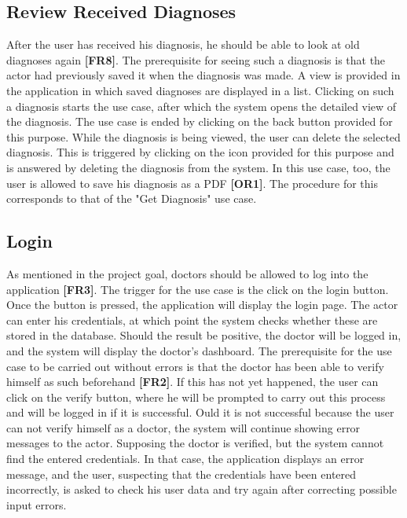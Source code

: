 \subsection{Review Received Diagnoses}
After the user has received his diagnosis, he should be able to look at old diagnoses again \textbf{[FR8]}. The prerequisite for seeing such a diagnosis is that the actor had previously saved it when the diagnosis was made. A view is provided in the application in which saved diagnoses are displayed in a list. Clicking on such a diagnosis starts the use case, after which the system opens the detailed view of the diagnosis. The use case is ended by clicking on the back button provided for this purpose. While the diagnosis is being viewed, the user can delete the selected diagnosis. This is triggered by clicking on the icon provided for this purpose and is answered by deleting the diagnosis from the system. In this use case, too, the user is allowed to save his diagnosis as a PDF \textbf{[OR1]}. The procedure for this corresponds to that of the "Get Diagnosis" use case.

\subsection{Login}
As mentioned in the project goal, doctors should be allowed to log into the application \textbf{[FR3]}. The trigger for the use case is the click on the login button. Once the button is pressed, the application will display the login page. The actor can enter his credentials, at which point the system checks whether these are stored in the database. Should the result be positive, the doctor will be logged in, and the system will display the doctor's dashboard. The prerequisite for the use case to be carried out without errors is that the doctor has been able to verify himself as such beforehand \textbf{[FR2]}. If this has not yet happened, the user can click on the verify button, where he will be prompted to carry out this process and will be logged in if it is successful. Ould it is not successful because the user can not verify himself as a doctor, the system will continue showing error messages to the actor. Supposing the doctor is verified, but the system cannot find the entered credentials. In that case, the application displays an error message, and the user, suspecting that the credentials have been entered incorrectly, is asked to check his user data and try again after correcting possible input errors.

